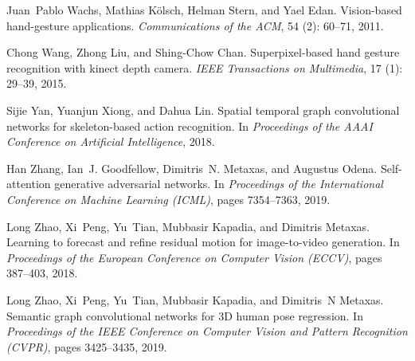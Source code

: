 \documentclass{bmvc2k}
\begin{document}
\begin{thebibliography}{42}
Juan~Pablo Wachs, Mathias K{\"o}lsch, Helman Stern, and Yael Edan.
\newblock Vision-based hand-gesture applications.
\newblock \emph{Communications of the ACM}, 54 (2): 60--71,
  2011.

Chong Wang, Zhong Liu, and Shing-Chow Chan.
\newblock Superpixel-based hand gesture recognition with kinect depth camera.
\newblock \emph{IEEE Transactions on Multimedia}, 17 (1):
  29--39, 2015.

Sijie Yan, Yuanjun Xiong, and Dahua Lin.
\newblock Spatial temporal graph convolutional networks for skeleton-based
  action recognition.
\newblock In \emph{Proceedings of the AAAI Conference on Artificial
  Intelligence}, 2018.

Han Zhang, Ian~J. Goodfellow, Dimitris~N. Metaxas, and Augustus Odena.
\newblock Self-attention generative adversarial networks.
\newblock In \emph{Proceedings of the International Conference on Machine
  Learning (ICML)}, pages 7354--7363, 2019.

Long Zhao, Xi~Peng, Yu~Tian, Mubbasir Kapadia, and Dimitris Metaxas.
\newblock Learning to forecast and refine residual motion for image-to-video
  generation.
\newblock In \emph{Proceedings of the European Conference on Computer Vision
  (ECCV)}, pages 387--403, 2018.

Long Zhao, Xi~Peng, Yu~Tian, Mubbasir Kapadia, and Dimitris~N Metaxas.
\newblock Semantic graph convolutional networks for {3D} human pose regression.
\newblock In \emph{Proceedings of the IEEE Conference on Computer Vision and
  Pattern Recognition (CVPR)}, pages 3425--3435, 2019.

\end{thebibliography}
 
\end{document}
